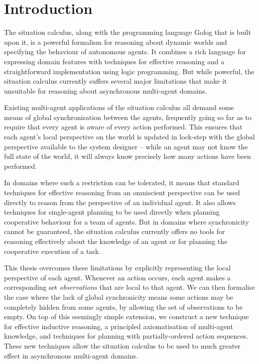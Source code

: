 

\chapter{Introduction}

\label{ch:intro}

The situation calculus, along with the programming language Golog
that is built upon it, is a powerful formalism for reasoning about
dynamic worlds and specifying the behaviour of autonomous agents.
It combines a rich language for expressing domain features with techniques
for effective reasoning and a straightforward implementation using
logic programming. But while powerful, the situation calculus currently
suffers several major limitations that make it unsuitable for reasoning
about asynchronous multi-agent domains.

Existing multi-agent applications of the situation calculus all demand
some means of global synchronisation between the agents, frequently
going so far as to require that every agent is aware of every action
performed. This ensures that each agent's local perspective on the
world is updated in lock-step with the global perspective available
to the system designer -- while an agent may not know the full state
of the world, it will always know precisely how many actions have
been performed.

In domains where such a restriction can be tolerated, it means that
standard techniques for effective reasoning from an omniscient perspective
can be used directly to reason from the perspective of an individual
agent. It also allows techniques for single-agent planning to be used
directly when planning cooperative behaviour for a team of agents.
But in domains where synchronicity cannot be guaranteed, the situation
calculus currently offers no tools for reasoning effectively about
the knowledge of an agent or for planning the cooperative execution
of a task.

This thesis overcomes these limitations by explicitly representing
the local perspective of each agent. Whenever an action occurs, each
agent makes a corresponding set \emph{observations} that are local
to that agent. We can then formalise the case where the lack of global
synchronicity means some actions may be completely hidden from some
agents, by allowing the set of observations to be empty. On top of
this seemingly simple extension, we construct a new technique for
effective inductive reasoning, a principled axiomatisation of multi-agent
knowledge, and techniques for planning with partially-ordered action
sequences. These new techniques allow the situation calculus to be
used to much greater effect in asynchronous multi-agent domains.


